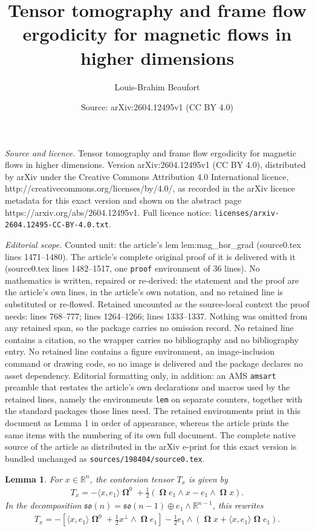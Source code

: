 \documentclass[10pt,a4paper]{amsart}
\title{Tensor tomography and frame flow ergodicity for magnetic flows in higher dimensions}
\author{Louis-Brahim Beaufort}
\date{Source: arXiv:2604.12495v1 (CC BY 4.0)}
\newtheorem{lem}{Lemma}
\newcommand{\R}{\mathbb{R}}
\newcommand{\con}[1]{T_{#1}}
\newcommand{\frk}[1]{\mathfrak{#1}}
\DeclareMathOperator{\oo}{\mathbf{\Omega}}
\begin{document}
\maketitle

\noindent\emph{Source and licence.} Tensor tomography and frame flow ergodicity for magnetic flows in higher dimensions. Version arXiv:2604.12495v1 (CC BY 4.0), distributed by arXiv under the Creative Commons Attribution 4.0 International licence, http://creativecommons.org/licenses/by/4.0/, as recorded in the arXiv licence metadata for this exact version and shown on the abstract page https://arxiv.org/abs/2604.12495v1. Full licence notice: \texttt{licenses/arxiv-2604.12495-CC-BY-4.0.txt}.\par\smallskip

\noindent\textit{Editorial scope.} Counted unit: the article's lem lem:mag\_hor\_grad (source0.tex lines 1471--1480). The article's complete original proof of it is delivered with it (source0.tex lines 1482--1517, one \texttt{proof} environment of 36 lines). No mathematics is written, repaired or re-derived: the statement and the proof are the article's own lines, in the article's own notation, and no retained line is substituted or re-flowed.  Retained uncounted as the source-local context the proof needs: lines 768--777; lines 1264--1266; lines 1333--1337.  Nothing was omitted from any retained span, so the package carries no omission record.  No retained line contains a citation, so the wrapper carries no bibliography and no bibliography entry.  No retained line contains a figure environment, an image-inclusion command or drawing code, so no image is delivered and the package declares no asset dependency.  Editorial formatting only, in addition: an AMS \texttt{amsart} preamble that restates the article's own declarations and macros used by the retained lines, namely the environments \texttt{lem} on separate counters, together with the standard packages those lines need.  The retained environments print in this document as Lemma 1 in order of appearance, whereas the article prints the same items with the numbering of its own full document.  The complete native source of the article as distributed in the arXiv e-print for this exact version is bundled unchanged as \texttt{sources/198404/source0.tex}.
\begin{lem} \label{lem:contorsion}
For $x \in \R^n$, the contorsion tensor $\con{x}$ is given by
\begin{align*}
\con{x} = - \langle x, e_1 \rangle \oo^0 + \frac{1}{2}(\oo e_1 \wedge x - e_1 \wedge \oo x).
\end{align*}
In the decomposition $\frk{so}(n) = \frk{so}(n-1) \oplus e_1 \wedge \R^{n-1}$, this rewrites 
\begin{align} \label{eq:decomp_contorsion}
\con{x} = - \left [\langle x, e_1 \rangle \oo^0 + \frac{1}{2} x^\perp \wedge \oo e_1 \right ] - \frac{1}{2} e_1 \wedge (\oo x + \langle x, e_1 \rangle \oo e_1).
\end{align}
\end{lem}
\end{document}
